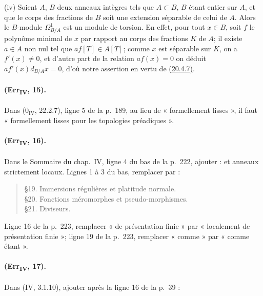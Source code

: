 \medskip
\noindent
(iv) Soient $A$, $B$ deux anneaux intègres tels que $A\subset B$, $B$
étant entier sur $A$, et que le corps des fractions de $B$ soit une
extension séparable de celui de $A$. Alors le $B$-module
$\Omega^1_{B/A}$ est un module de torsion. En effet, pour tout $x\in B$,
soit $f$ le polynôme minimal de $x$ par rapport au corps des fractions
$K$ de $A$; il existe $a\in A$ non nul tel que $af[T]\in A[T]$; comme
$x$ est séparable sur $K$, on a $f'(x)\neq0$, et d'autre part de la
relation $af(x)=0$ on déduit $af'(x)d_{B/A}x=0$, d'où notre assertion
en vertu de {\hyperlink{ega4.c04.cor.20-4-7}{(20.4.7)}}.

\paragraph{(Err\textsubscript{IV}, 15).}
Dans ($0_{\mathrm{IV}}$, 22.2.7), ligne 5 de la p.~189, au lieu de
« formellement lisses », il faut « formellement lisses pour les
topologies préadiques ».

\paragraph{(Err\textsubscript{IV}, 16).}
Dans le Sommaire du chap.~IV, ligne 4 du bas de la p.~222, ajouter :
et anneaux strictement locaux. Lignes 1 à 3 du bas, remplacer par :
\begin{quote}
\S19. Immersions régulières et platitude normale.\\
\S20. Fonctions méromorphes et pseudo-morphismes.\\
\S21. Diviseurs.
\end{quote}
Ligne 16 de la p.~223, remplacer « de présentation finie » par
« localement de présentation finie »; ligne 19 de la p.~223, remplacer
« comme » par « comme étant ».

\paragraph{(Err\textsubscript{IV}, 17).}
Dans (IV, 3.1.10), ajouter après la ligne 16 de la p.~39 :

